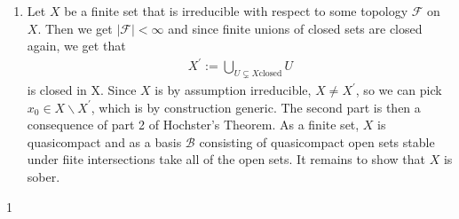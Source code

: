 \newcommand{\sheet}{3}




\maketitle{}

\begin{exercise}{1}
    \begin{enumerate}
        \item Let $X$ be a finite set that is irreducible with 
        respect to some topology $\mathcal{F}$ on $X$. Then we get
        $\mid \mathcal{F} \mid<\infty$ and since finite unions of
        closed sets are closed again, we get that
        \begin{align*}
            X^{\prime}:=\bigcup_{U \subsetneq X \text{closed}}{U}
        \end{align*}
        is closed in X. Since $X$ is by assumption irreducible,
        $X\neq X^{\prime}$, so we can pick $x_0\in X \backslash X^{\prime}$,
        which is by construction generic. The second part is then a
        consequence of part 2 of Hochster's Theorem. As a finite set, $X$ is 
        quasicompact and as a basis $\mathcal{B}$ consisting of quasicompact 
        open sets stable under fiite intersections take all of the open sets. 
        It remains to show that $X$ is sober. 
    \end{enumerate}
\end{exercise}{1}


